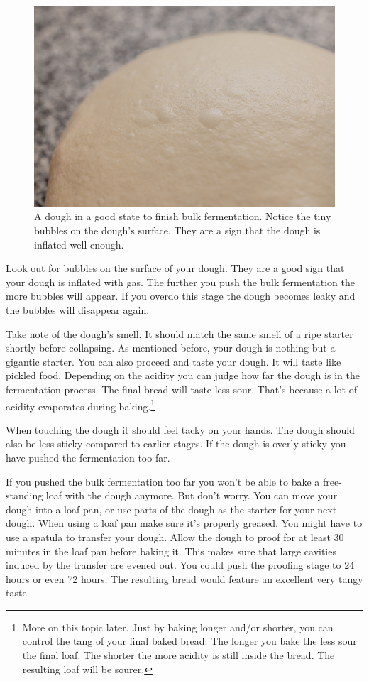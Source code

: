 \begin{figure}[!htb]
  \includegraphics[width=\textwidth]{bulk-finished-dough}
  \caption{A dough in a good state to finish bulk fermentation. Notice
  the tiny bubbles on the dough's surface. They are a sign that the dough
  is inflated well enough.}
\end{figure}

Look out for bubbles on the surface of your dough. They
are a good sign that your dough is inflated with gas. The
further you push the bulk fermentation the more bubbles
will appear. If you overdo this stage the dough becomes leaky and
the bubbles will disappear again.

Take note of the dough's smell. It should match the same
smell of a ripe starter shortly before collapsing. As mentioned
before, your dough is nothing but a gigantic starter. You
can also proceed and taste your dough. It will taste like
pickled food. Depending on the acidity you can judge how
far the dough is in the fermentation process. The final bread
will taste less sour. That's because a lot of acidity evaporates
during baking.\footnote{More on this topic later.
Just by baking longer and/or shorter, you can control
the tang of your final baked bread. The longer
you bake the less sour the final loaf. The shorter
the more acidity is still inside the bread. The resulting
loaf will be sourer.}

When touching the dough it should feel tacky
on your hands. The dough should also be less sticky
compared to earlier stages. If the dough is overly
sticky you have pushed the fermentation too far.

If you pushed the bulk fermentation too far you won't be able
to bake a free-standing loaf with the dough anymore. But don't
worry. You can move your dough into a loaf pan, or use parts
of the dough as the starter for your next dough. When using
a loaf pan make sure it's properly greased. You might have
to use a spatula to transfer your dough. Allow the dough
to proof for at least 30 minutes in the loaf pan before
baking it. This makes sure that large cavities induced
by the transfer are evened out. You could push the proofing
stage to 24 hours or even 72 hours. The resulting
bread would feature an excellent very tangy taste.


